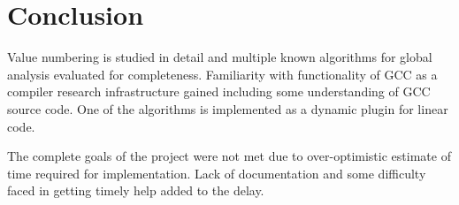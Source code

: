 \chapter{Conclusion}

Value numbering is studied in detail and multiple known algorithms for global analysis evaluated for completeness. 
Familiarity with functionality of GCC as a compiler research infrastructure gained including some understanding of GCC source code. One of the algorithms is implemented as a dynamic plugin for linear code.

The complete goals of the project were not met due to over-optimistic estimate of time required for implementation. Lack of documentation and some difficulty faced in getting timely help added to the delay. 
